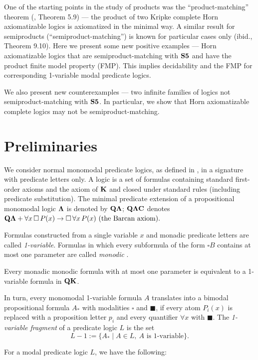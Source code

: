 \documentclass[twoside]{aiml20}
\def\fo{\forall}
\def\ri{\rightarrow}
\def\BK{{\bf K}}
\def\BQ{{\bf Q}}
\def\BC{{\bf C}}
\def\sqr{\square}
\def\bLa{{\bf \Lambda}}
\def\bLa{{\bf \Lambda}}
\def\bS5{{\bf S5}}
\def\fo{\forall}
\def\ri{\rightarrow}
\def\sqr{\square}
\begin{document}
{One of the starting points in the study of products was the
``product-matching'' theorem (\cite{GKWZ}, Theorem 5.9) --- the
product of two Kripke complete Horn axiomatizable logics is
axiomatized in the minimal way. A similar result for semiproducts
(``semiproduct-matching'') is known for particular cases only (ibid.,
Theorem 9.10).  Here we present some new positive examples --- Horn
axiomatizable logics that are semiproduct-matching with $\bS5$ and
have the product finite model property (FMP). This implies
decidability and the FMP for corresponding 1-variable modal predicate
logics.

We also present new counterexamples --- two infinite families of logics not semiproduct-matching with $\bS5$. In particular, we show that
Horn axiomatizable complete logics may not be semiproduct-matching.

\section{Preliminaries}
We consider normal monomodal predicate logics, as defined in
\cite{GSS}, in a signature with predicate letters only.  A logic is a
set of formulas containing standard first-order axioms and the axiom
of $\BK$ and closed under standard rules (including predicate
substitution).  The minimal predicate extension of a propositional
monomodal logic $\bLa$ is denoted by $\BQ\bLa$; $\BQ\bLa\BC$ denotes
$\BQ\bLa+\forall x\, \sqr\, P(x) \ri \sqr\, \forall x\, P(x)\mbox{
  (the Barcan axiom)}.$

Formulas constructed from a single variable $x$ and monadic predicate
letters are called {\em 1-variable}. Formulas in which every
subformula of the form $\sqr B$ contains at most one parameter are
called {\em monodic} \cite{GKWZ}.

\begin{lemma}\label{L11}
  Every monadic monodic formula with at most one parameter is
  equivalent to a 1-variable formula in $\BQ\BK$.
\end{lemma}

In turn, every monomodal
 1-variable formula $A$ translates into a bimodal
propositional formula $A_*$ with modalities $\sqr$ and $\blacksquare$,
if every atom $P_i(x)$ is replaced with a proposition letter $p_i$ and
every quantifier $\fo x$ with $\blacksquare$.  The {\em 1-variable
  fragment} of a predicate logic $L$ is the set
$$L\!-\!1:=\{A_*\mid A\in L,~ A\mbox{ is 1-variable}\}.$$

For a modal predicate logic $L$, we have the
following:

}
\end{document}
